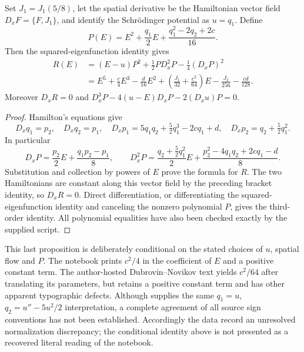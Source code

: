 \begin{proposition}\oursComputed
Set \(J_1=J_1(5/8)\), let the spatial derivative be the Hamiltonian vector field \(D_xF=\{F,J_1\}\), and identify the Schrödinger potential as \(u=q_1\). Define
\[
 P(E)=E^2+\frac{q_1}2E+\frac{q_1^2-2q_2+2c}{16}.
\]
Then the squared-eigenfunction identity gives
\begin{align*}
 R(E)&=(E-u)P^2+\frac12P D_x^2P-\frac14(D_xP)^2\\
 &=E^5+\frac c4E^3-\frac d{16}E^2
   +\left(\frac{J_1}{32}+\frac{c^2}{64}\right)E
   -\frac{J_2}{256}-\frac{cd}{128}.
\end{align*}
Moreover \(D_xR=0\) and
\(D_x^3P-4(u-E)D_xP-2(D_xu)P=0\).
\end{proposition}
\begin{proof}
Hamilton's equations give
\[
 D_xq_1=p_2,\quad D_xq_2=p_1,\quad
 D_xp_1=5q_1q_2+\tfrac52q_1^3-2cq_1+d,\quad
 D_xp_2=q_2+\tfrac52q_1^2.
\]
In particular
\[
 D_xP=\frac{p_2}2E+\frac{q_1p_2-p_1}{8},\qquad
 D_x^2P=\frac{q_2+\frac52q_1^2}{2}E
          +\frac{p_2^2-4q_1q_2+2cq_1-d}{8}.
\]
Substitution and collection by powers of \(E\) prove the formula for \(R\). The two Hamiltonians are constant along this vector field by the preceding bracket identity, so \(D_xR=0\). Direct differentiation, or differentiating the squared-eigenfunction identity and canceling the nonzero polynomial \(P\), gives the third-order identity. All polynomial equalities have also been checked exactly by the supplied script.
\end{proof}

This last proposition is deliberately conditional on the stated choices of \(u\), spatial flow and \(P\). The notebook prints \(c^2/4\) in the coefficient of \(E\) and a positive constant term. The author-hosted Dubrovin--Novikov text yields \(c^2/64\) after translating its parameters, but retains a positive constant term and has other apparent typographic defects. Although \citet[Ch.~II, \S4, p.~105]{dubrovinmatveevnovikov1976nonlinear} supplies the same \(q_1=u\), \(q_2=u''-5u^2/2\) interpretation, a complete agreement of all source sign conventions has not been established. Accordingly the data record an unresolved normalization discrepancy; the conditional identity above is not presented as a recovered literal reading of the notebook.
